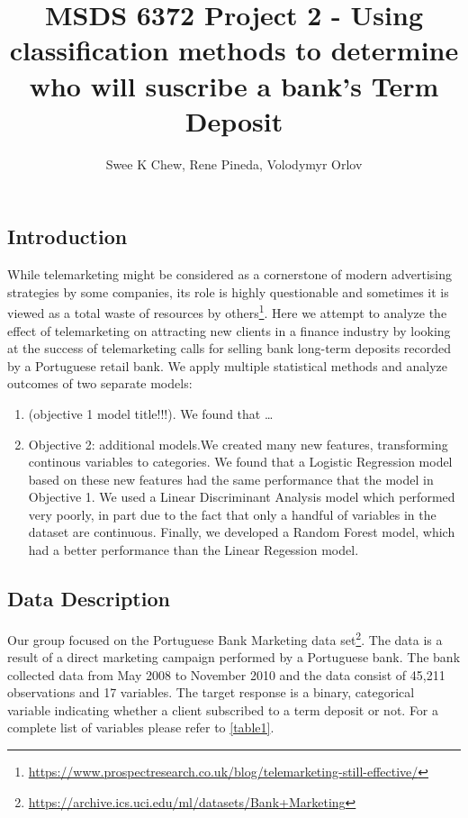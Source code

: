 \documentclass[]{article}
\title{MSDS 6372 Project 2 - Using classification methods to determine who will
suscribe a bank's Term Deposit}
\author{Swee K Chew, Rene Pineda, Volodymyr Orlov}
\date{}
\providecommand{\tightlist}{%
  \setlength{\itemsep}{0pt}\setlength{\parskip}{0pt}}
\let\rmarkdownfootnote\footnote%
\def\footnote{\protect\rmarkdownfootnote}
\begin{document}
\maketitle

\subsection{Introduction}\label{introduction}

While telemarketing might be considered as a cornerstone of modern
advertising strategies by some companies, its role is highly
questionable and sometimes it is viewed as a total waste of resources by
others\footnote{\url{https://www.prospectresearch.co.uk/blog/telemarketing-still-effective/}}.
Here we attempt to analyze the effect of telemarketing on attracting new
clients in a finance industry by looking at the success of telemarketing
calls for selling bank long-term deposits recorded by a Portuguese
retail bank. We apply multiple statistical methods and analyze outcomes
of two separate models:

\begin{enumerate}
\def\labelenumi{\arabic{enumi}.}
\tightlist
\item
  (objective 1 model title!!!). We found that \ldots{}
\item
  Objective 2: additional models.We created many new features,
  transforming continous variables to categories. We found that a
  Logistic Regression model based on these new features had the same
  performance that the model in Objective 1. We used a Linear
  Discriminant Analysis model which performed very poorly, in part due
  to the fact that only a handful of variables in the dataset are
  continuous. Finally, we developed a Random Forest model, which had a
  better performance than the Linear Regession model.
\end{enumerate}

\subsection{Data Description}\label{data-description}

Our group focused on the Portuguese Bank Marketing data set\footnote{\url{https://archive.ics.uci.edu/ml/datasets/Bank+Marketing}}.
The data is a result of a direct marketing campaign performed by a
Portuguese bank. The bank collected data from May 2008 to November 2010
and the data consist of 45,211 observations and 17 variables. The target
response is a binary, categorical variable indicating whether a client
subscribed to a term deposit or not. For a complete list of variables
please refer to \autoref{table1}.
\end{document}
